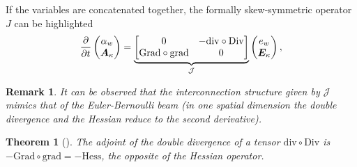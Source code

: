 \documentclass[letterpaper, 10 pt, conference]{ieeeconf}
\newtheorem{theorem}{Theorem}
\newtheorem{remark}{Remark}
\begin{document}
If the variables are concatenated together, the formally skew-symmetric operator $J$ can be highlighted 
\begin{equation}
\label{eq:PH_sys_Kir_Ten}
\diffp{}{t}
\begin{pmatrix}
\alpha_w \\
\bm{A}_\kappa \\
\end{pmatrix} = 
\underbrace{\begin{bmatrix}
	0  & -\mathrm{div} \circ \mathrm{Div} \\
	\mathrm{Grad} \circ \mathrm{grad}  & 0 \\
	\end{bmatrix}}_{\mathcal{J}}
\begin{pmatrix}
e_w \\
\bm{E}_{\kappa} \\
\end{pmatrix},
\end{equation}
\begin{remark}
	It can be observed that the interconnection structure given by $\mathcal{J}$ mimics that of the Euler-Bernoulli beam (in one spatial dimension the double divergence and the Hessian reduce to the second derivative).
\end{remark}


\begin{theorem}[\cite{BrugnoliKir}]
	The adjoint of the double divergence of a tensor $\mathrm{div} \circ \mathrm{Div}$ is $ - \mathrm{Grad} \circ  \mathrm{grad} = - \mathrm{Hess}$, the opposite of the Hessian operator.
\end{theorem}
\end{document}

